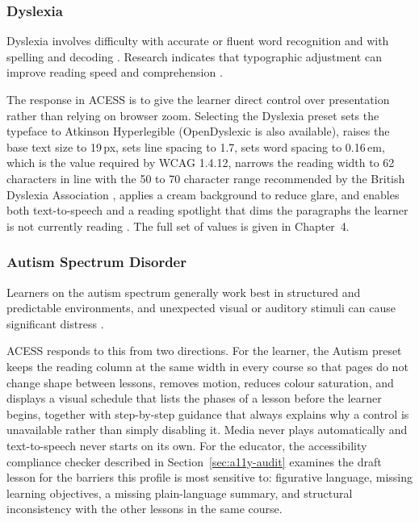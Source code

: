 \documentclass[12pt, oneside]{article} %
\begin{document}
\subsubsection{Dyslexia}
Dyslexia involves difficulty with accurate or fluent word recognition and with spelling and decoding \cite{rello2013effect}. Research indicates that typographic adjustment can improve reading speed and comprehension \cite{franceschini_dyslexia}.

The response in ACESS is to give the learner direct control over presentation rather than relying on browser zoom. Selecting the Dyslexia preset sets the typeface to Atkinson Hyperlegible \cite{atkinson2021atkinson} (OpenDyslexic \cite{opendyslexic} is also available), raises the base text size to 19\,px, sets line spacing to 1.7, sets word spacing to 0.16\,em, which is the value required by WCAG 1.4.12, narrows the reading width to 62 characters in line with the 50 to 70 character range recommended by the British Dyslexia Association \cite{bda_style_guide}, applies a cream background to reduce glare, and enables both text-to-speech and a reading spotlight that dims the paragraphs the learner is not currently reading \cite{batanero2014accessibility}. The full set of values is given in Chapter~4.

\subsubsection{Autism Spectrum Disorder}
Learners on the autism spectrum generally work best in structured and predictable environments, and unexpected visual or auditory stimuli can cause significant distress \cite{lawson2011autism}.

ACESS responds to this from two directions. For the learner, the Autism preset keeps the reading column at the same width in every course so that pages do not change shape between lessons, removes motion, reduces colour saturation, and displays a visual schedule that lists the phases of a lesson before the learner begins, together with step-by-step guidance that always explains why a control is unavailable rather than simply disabling it. Media never plays automatically and text-to-speech never starts on its own. For the educator, the accessibility compliance checker described in Section~\ref{sec:a11y-audit} examines the draft lesson for the barriers this profile is most sensitive to: figurative language, missing learning objectives, a missing plain-language summary, and structural inconsistency with the other lessons in the same course.
\end{document}

